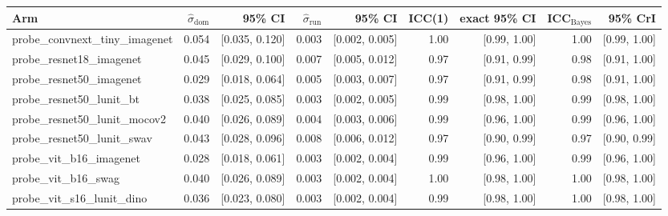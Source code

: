 \begin{tabular}{lrrrrrrrr}
\toprule
Arm & $\hat\sigma_\text{dom}$ & 95\% CI & $\hat\sigma_\text{run}$ & 95\% CI & ICC(1) & exact 95\% CI & ICC$_\text{Bayes}$ & 95\% CrI \\
\midrule
probe\_convnext\_tiny\_imagenet & 0.054 & [0.035, 0.120] & 0.003 & [0.002, 0.005] & 1.00 & [0.99, 1.00] & 1.00 & [0.99, 1.00] \\
probe\_resnet18\_imagenet & 0.045 & [0.029, 0.100] & 0.007 & [0.005, 0.012] & 0.97 & [0.91, 0.99] & 0.98 & [0.91, 1.00] \\
probe\_resnet50\_imagenet & 0.029 & [0.018, 0.064] & 0.005 & [0.003, 0.007] & 0.97 & [0.91, 0.99] & 0.98 & [0.91, 1.00] \\
probe\_resnet50\_lunit\_bt & 0.038 & [0.025, 0.085] & 0.003 & [0.002, 0.005] & 0.99 & [0.98, 1.00] & 0.99 & [0.98, 1.00] \\
probe\_resnet50\_lunit\_mocov2 & 0.040 & [0.026, 0.089] & 0.004 & [0.003, 0.006] & 0.99 & [0.96, 1.00] & 0.99 & [0.96, 1.00] \\
probe\_resnet50\_lunit\_swav & 0.043 & [0.028, 0.096] & 0.008 & [0.006, 0.012] & 0.97 & [0.90, 0.99] & 0.97 & [0.90, 0.99] \\
probe\_vit\_b16\_imagenet & 0.028 & [0.018, 0.061] & 0.003 & [0.002, 0.004] & 0.99 & [0.96, 1.00] & 0.99 & [0.96, 1.00] \\
probe\_vit\_b16\_swag & 0.040 & [0.026, 0.089] & 0.003 & [0.002, 0.004] & 1.00 & [0.98, 1.00] & 1.00 & [0.98, 1.00] \\
probe\_vit\_s16\_lunit\_dino & 0.036 & [0.023, 0.080] & 0.003 & [0.002, 0.004] & 0.99 & [0.98, 1.00] & 1.00 & [0.98, 1.00] \\
\bottomrule
\end{tabular}
